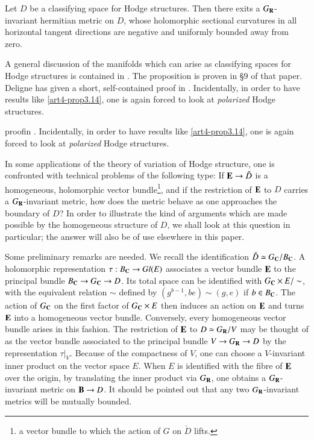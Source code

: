 \begin{proposition}\label{art4-prop3.14}
Let $D$ be a classifying space for Hodge structures. Then there exits a $G_{\mathbf{R}}$-invariant hermitian metric on $D$, whose holomorphic sectional curvatures in all horizontal tangent directions are negative and uniformly bounded away from zero.
\end{proposition}

A general discussion of the manifolds which can arise as classifying spaces for Hodge structures is contained in \cite{art4-key25}. The proposition is proven in \S 9 of that paper. Deligne has given a short, self-contained proof in \cite{art4-key11}. Incidentally, in order to have results like \eqref{art4-prop3.14}, one is again forced to look at \textit{polarized} Hodge structures. 

proof\pageoriginale in \cite{art4-key11}. Incidentally, in order to have results like \eqref{art4-prop3.14}, one is again forced to look at \textit{polarized} Hodge structures.

In some applications of the theory of variation of Hodge structure, one is confronted with technical problems of the following type: If $\mathbf{E} \to \check{D}$ is a homogeneous, holomorphic vector bundle\footnote[10]{\ie a vector bundle to which the action of $G$ on $\check{D}$ lifts.}, and if the restriction of $\mathbf{E}$ to $D$ carries a $G_{\mathbf{R}}$-invariant metric, how does the metric behave as one approaches the boundary of $D$? In order to illustrate the kind of arguments which are made possible by the homogeneous  structure of $D$, we shall look at this question in particular; the answer will also be of use elsewhere in this paper.

Some preliminary remarks are needed. We recall the identification $\check{D} \simeq G_{\mathbf{C}} / B_{\mathbf{C}}$. A holomorphic representation $\tau: B_{\mathbf{C}} \to Gl (E)$ associates a vector bundle $\mathbf{E}$ to the principal bundle $B_{\mathbf{C}} \to G_{\mathbf{C}} \to D$. Its total space can be identified with $G_{\mathbf{C}} \times E/ \sim$, with the equivalent relation $\sim$ defined by $(g^{b-1}, be) \sim (g,e)$ if $b \in B_{\mathbf{C}}$. The action of $G_{\mathbf{C}}$ on the first factor of $G_{\mathbf{C}} \times E$ then induces an action on $\mathbf{E}$ and turns $\mathbf{E}$ into a homogeneous vector bundle. Conversely, every homogeneous vector bundle arises in this fashion. The restriction of $\mathbf{E}$ to $D \simeq G_{\mathbf{R}} / V$ may be thought of as the vector bundle associated to the principal bundle $V \to G_{\mathbf{R}} \to D$ by the representation $\tau|_V$. Because of the compactness of $V$, one can choose a $V$-invariant inner product on the vector space $E$. When $E$ is identified with the fibre of $\mathbf{E}$ over the origin, by translating the inner product via $G_{\mathbf{R}}$, one obtains a $G_{\mathbf{R}}$-invariant metric on $\mathbf{B} \to D$. It should be pointed out that any two $G_{\mathbf{R}}$-invariant metrics will be mutually bounded.

